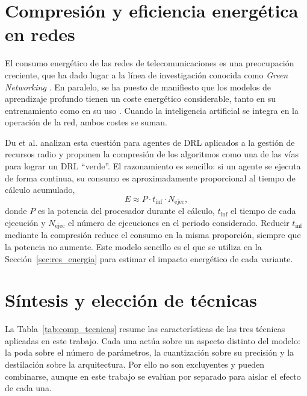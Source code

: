 \section{Compresión y eficiencia energética en redes}\label{sec:comp_green}

El consumo energético de las redes de telecomunicaciones es una preocupación creciente, que ha dado lugar a la línea de investigación conocida como \textit{Green Networking} \cite{bianzino2012survey}. En paralelo, se ha puesto de manifiesto que los modelos de aprendizaje profundo tienen un coste energético considerable, tanto en su entrenamiento como en su uso \cite{strubell2019energy}. Cuando la inteligencia artificial se integra en la operación de la red, ambos costes se suman.

Du et al. \cite{du2020green} analizan esta cuestión para agentes de DRL aplicados a la gestión de recursos radio y proponen la compresión de los algoritmos como una de las vías para lograr un DRL ``verde''. El razonamiento es sencillo: si un agente se ejecuta de forma continua, su consumo es aproximadamente proporcional al tiempo de cálculo acumulado,
\begin{equation}\label{eq:energia}
	E \approx P \cdot t_{\text{inf}} \cdot N_{\text{ejec}},
\end{equation}
donde $P$ es la potencia del procesador durante el cálculo, $t_{\text{inf}}$ el tiempo de cada ejecución y $N_{\text{ejec}}$ el número de ejecuciones en el periodo considerado. Reducir $t_{\text{inf}}$ mediante la compresión reduce el consumo en la misma proporción, siempre que la potencia no aumente. Este modelo sencillo es el que se utiliza en la Sección~\ref{sec:res_energia} para estimar el impacto energético de cada variante.

\section{Síntesis y elección de técnicas}\label{sec:comp_sintesis}

La Tabla~\ref{tab:comp_tecnicas} resume las características de las tres técnicas aplicadas en este trabajo. Cada una actúa sobre un aspecto distinto del modelo: la poda sobre el número de parámetros, la cuantización sobre su precisión y la destilación sobre la arquitectura. Por ello no son excluyentes y pueden combinarse, aunque en este trabajo se evalúan por separado para aislar el efecto de cada una.

